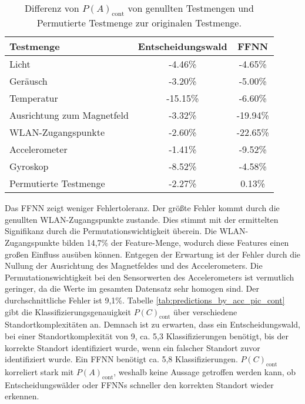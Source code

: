 \begin{table}[h!]
    \centering
    \begin{tabular}{ | l | c | c | }
        \hline
        Testmenge & Entscheidungswald & FFNN \\\hline
        Licht & -4.46\% & -4.65\% \\\hline
        Geräusch & -3.20\% & -5.00\% \\\hline
        Temperatur & -15.15\% & -6.60\% \\\hline
        Ausrichtung zum Magnetfeld & -3.32\% & -19.94\% \\\hline
        WLAN-Zugangspunkte & -2.60\% & -22.65\% \\\hline
        Accelerometer & -1.41\% & -9.52\% \\\hline
        Gyroskop & -8.52\% & -4.58\% \\\hline
        Permutierte Testmenge & -2.27\% & 0.13\% \\\hline
    \end{tabular}
    \caption{Differenz von $P(A)_{\text{cont}}$ von genullten Testmengen und Permutierte Testmenge zur originalen Testmenge.}
    \label{tab:robustness_by_acc_cont}
\end{table}
\newline
\newline
Das FFNN zeigt weniger Fehlertoleranz.
Der größte Fehler kommt durch die genullten WLAN-Zugangspunkte zustande.
Dies stimmt mit der ermittelten Signifikanz durch die Permutationswichtigkeit überein.
Die WLAN-Zugangspunkte bilden 14,7\% der Feature-Menge, wodurch diese Features einen großen Einfluss ausüben können.
\newline
Entgegen der Erwartung ist der Fehler durch die Nullung der Ausrichtung des Magnetfeldes und des Accelerometers.
Die Permutationswichtigkeit bei den Sensorwerten des Accelerometers ist vermutlich geringer,
da die Werte im gesamten Datensatz sehr homogen sind.
Der durchschnittliche Fehler ist 9,1\%.
\newpage
Tabelle \ref{tab:predictions_by_acc_pic_cont} gibt die Klassifizierungsgenauigkeit $P(C)_{\text{cont}}$ über verschiedene Standortkomplexitäten an.
Demnach ist zu erwarten, dass ein Entscheidungswald, bei einer Standortkomplexität von 9, ca. 5,3 Klassifizierungen benötigt, bis der korrekte Standort identifiziert wurde,
wenn ein falscher Standort zuvor identifiziert wurde.
Ein FFNN benötigt ca. 5,8 Klassifizierungen.
$P(C)_{\text{cont}}$ korreliert stark mit $P(A)_{\text{cont}}$, weshalb keine Aussage getroffen werden kann, ob Entscheidungswälder oder FFNNs schneller den korrekten Standort wieder erkennen.
